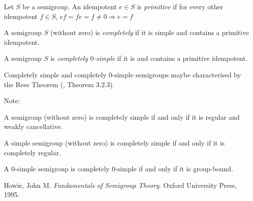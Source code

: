 \documentclass[12pt]{article}
\begin{document}
Let $S$ be a semigroup.  An idempotent $e\in S$ is \emph{primitive} if for every other idempotent $f\in S$, $ef=fe=f\not= 0\Rightarrow e=f$

A semigroup $S$ (without zero) is \emph{completely } if it is simple and contains a primitive idempotent.

A semigroup $S$ is \emph{completely $0$-simple} if it is  and contains a primitive idempotent.

Completely simple and completely $0$-simple semigroups maybe characterised by the Rees Theorem (\cite{ReesRef}, Theorem 3.2.3).

Note:

A semigroup (without zero) is completely simple if and only if it is regular and weakly cancellative.

A simple semigroup (without zero) is completely simple if and only if it is completely regular.

A $0$-simple semigroup is completely $0$-simple if and only if it is group-bound.

\begin{thebibliography}{2}
 Howie, John M.  \emph{Fundamentals of Semigroup Theory}.  Oxford University Press, 1995.
\end{thebibliography}
\end{document}

